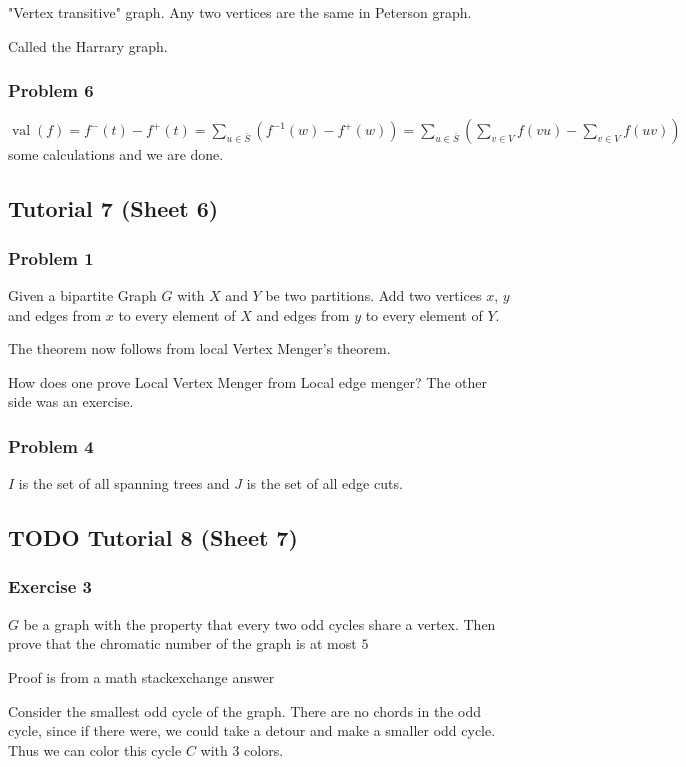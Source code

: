\documentclass[11pt]{article}
\def\val{\operatorname{val}}
\begin{document}
"Vertex transitive" graph. Any two vertices are the same in Peterson graph.

Called the Harrary graph.
\subsubsection{Problem 6}
\label{sec:org966c6ec}
\(\val(f) = f^-(t) - f^{+}(t) = \sum_{u \in \bar{S}} (f^{-1}(w) - f^{+}(w)) =
    \sum_{u\in \bar{S}}(\sum_{v \in V} f(vu) - \sum_{v \in V} f(uv))\) some
calculations and we are done.
\subsection{Tutorial 7 (Sheet 6)}
\label{sec:org46027f5}
\subsubsection{Problem 1}
\label{sec:org4b98d2b}
Given a bipartite Graph \(G\) with \(X\) and \(Y\) be two partitions. Add two
vertices \(x\), \(y\) and edges from \(x\) to every element of \(X\) and edges from
\(y\) to every element of \(Y\).

The theorem now follows from local Vertex Menger's theorem.

How does one prove Local Vertex Menger from Local edge menger? The other
side was an exercise.
\subsubsection{Problem 4}
\label{sec:org53c15f5}
\(I\) is the set of all spanning trees and \(J\) is the set of all edge cuts.
\subsection{{\bfseries\sffamily TODO} Tutorial 8 (Sheet 7)}
\label{sec:org67e5eef}
\subsubsection{Exercise 3}
\label{sec:org640d2a3}
\(G\) be a graph with the property that every two odd cycles share a vertex.
Then prove that the chromatic number of the graph is at most \(5\)

Proof is from a math stackexchange answer

Consider the smallest odd cycle of the graph. There are no chords in the odd
cycle, since if there were, we could take a detour and make a smaller odd
cycle. Thus we can color this cycle \(C\) with \(3\) colors.
\end{document}

